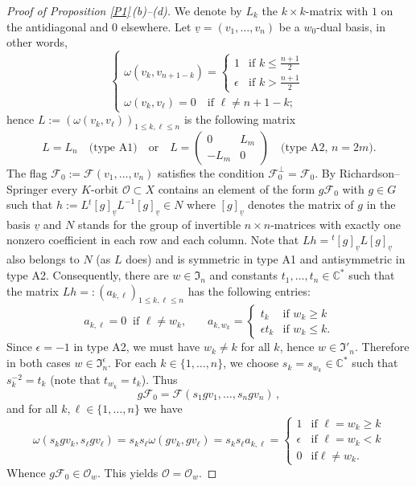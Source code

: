 \documentclass{amsart}
\theoremstyle{definition}
\begin{document}
\begin{proof}[Proof of Proposition \ref{P1}\,{\rm (b)}--{\rm (d)}]
We denote by $L_k$ the $k\times k$-matrix with $1$ on the
antidiagonal and $0$ elsewhere. Let
$\underline{v}=(v_1,\ldots,v_n)$ be a $w_0$-dual basis, in other
words,
\[
\left\{
\begin{array}{ll}
\omega(v_k,v_{n+1-k})=\left\{\begin{array}{ll}
1 & \mbox{if $k\leq\frac{n+1}{2}$} \\[1mm] \epsilon & \mbox{if $k>\frac{n+1}{2}$}
\end{array}\right. \\[4mm]
\omega(v_k,v_\ell)=0\quad\mbox{if $\ell\not=n+1-k$;}
\end{array}
\right.
\]
hence $L:=\left(\omega(v_k,v_\ell)\right)_{1\leq k,\ell\leq n}$ is
the following matrix
\[
L=L_n\quad \mbox{(type A1)}\quad\mbox{or}\quad L=\left(\begin{matrix} 0 & L_m \\ -L_m & 0 \end{matrix}\right)\quad\mbox{(type A2, $n=2m$)}.
\]
The flag $\mathcal{F}_0:=\mathcal{F}(v_1,\ldots,v_n)$ satisfies the
condition $\mathcal{F}_0^\perp=\mathcal{F}_0$. By
Richardson--Springer \cite{Richardson-Springer} every $K$-orbit
$\mathcal{O}\subset X$ contains an element of the form
$g\mathcal{F}_0$ with $g\in G$ such that
$h:=L{}^t[g]_{\underline{v}}L^{-1}[g]_{\underline{v}}\in N$ where
$[g]_{\underline{v}}$ denotes the matrix of $g$ in the basis
$\underline{v}$ and $N$ stands for the group of invertible $n\times
n$-matrices with exactly one nonzero coefficient in each row
and each column. Note that
$Lh={}^t[g]_{\underline{v}}L[g]_{\underline{v}}$ also belongs to $N$
(as $L$ does) and is symmetric in type A1 and antisymmetric in
type A2. Consequently, there are $w\in\mathfrak{I}_n$ and constants
$t_1,\ldots,t_n\in\mathbb{C}^*$ such that the matrix
$Lh=:\left(a_{k,\ell}\right)_{1\leq k,\ell\leq n}$ has the following
entries:
\[
a_{k,\ell}=0\ \mbox{ if $\ell\not=w_k$,}\qquad
a_{k,w_k}=\left\{\begin{array}{ll} t_k & \mbox{if $w_k\geq k$}
\\ \epsilon t_k & \mbox{if $w_k\leq k$.}
\end{array}\right.
\]
Since $\epsilon=-1$ in type A2, we must have $w_k\not=k$ for all $k$,
hence $w\in\mathfrak{I}'_n$. Therefore in both cases
$w\in\mathfrak{I}^\epsilon_n$. 
For each $k\in\{1,\ldots,n\}$, we
choose $s_k=s_{w_k}\in\mathbb{C}^*$ such that $s_k^{-2}=t_k$
(note that $t_{w_k}=t_k$).
Thus
\[g\mathcal{F}_0=\mathcal{F}(s_1gv_1,\ldots,s_ngv_n)\,,\]
and for all $k,\ell\in\{1,\ldots,n\}$ we have
\[
\omega(s_kgv_k,s_\ell g
v_\ell)=s_ks_\ell\omega(gv_k,gv_\ell)=s_ks_\ell
a_{k,\ell}=\left\{\begin{array}{ll} 1 & \mbox{if $\ell=w_k\geq k$}
\\ \epsilon & \mbox{if $\ell=w_k< k$} \\ 0 & \mbox{if
$\ell\not=w_k$}.
\end{array}\right.
\]
Whence $g\mathcal{F}_0\in\mathcal{O}_w$. This yields
$\mathcal{O}=\mathcal{O}_w$.


\end{proof}
\end{document}
